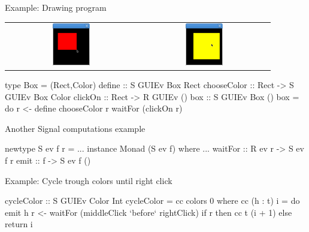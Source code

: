 \documentclass{beamer}
\begin{document}
\begin{frame}{Example: Drawing program}
\centering
\begin{tabular}{c c}
\includegraphics[width=0.3\textwidth]{01.png}
&
\includegraphics[width=0.3\textwidth]{02.png}
\end{tabular}
\begin{code}
type Box = (Rect,Color)
define        ::          S GUIEv Box Rect
chooseColor   :: Rect ->  S GUIEv Box Color
clickOn       :: Rect ->  R GUIEv ()
box ::  S GUIEv Box ()
box = do  r <- define
          chooseColor r
          waitFor (clickOn r)
\end{code}
\end{frame}


\begin{frame}{Another Signal computations example}
\begin{code} 
newtype S ev f r = ...
instance Monad (S ev f) where ...
waitFor   :: R ev r -> S ev f r
emit      :: f -> S ev f ()
\end{code}

Example: Cycle trough colors until right click 
\begin{code}
cycleColor :: S GUIEv Color Int
cycleColor = cc colors 0 where
   cc (h : t) i = 
     do  emit h
         r <- waitFor (middleClick `before` rightClick)
         if r then cc t (i + 1) else return i
\end{code}

\end{frame}
\end{document}
